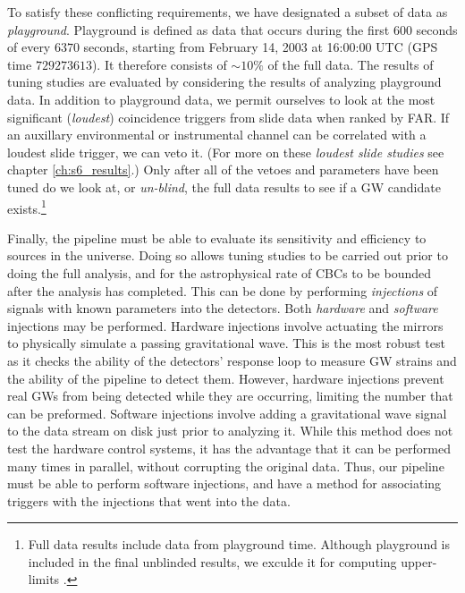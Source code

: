 To satisfy these conflicting requirements, we have designated a subset of data
as \emph{playground}. Playground is defined as data that occurs during the
first $600$ seconds of every $6370$ seconds, starting from February 14, 2003 at
16:00:00 UTC (GPS time $729273613$). It therefore consists of $\sim10\%$ of the
full data. The results of tuning studies are evaluated by considering the
results of analyzing playground data. In addition to playground data, we permit
ourselves to look at the most significant (\emph{loudest}) coincidence triggers
from slide data when ranked by \ac{FAR}. If an auxillary environmental or
instrumental channel can be correlated with a loudest slide trigger, we can
veto it. (For more on these \emph{loudest slide studies} see chapter
\ref{ch:s6_results}.) Only after all of the vetoes and parameters have been
tuned do we look at, or \emph{un-blind}, the full data results to see if a
\ac{GW} candidate exists.\footnote{Full data results include data from
playground time. Although playground is included in the final unblinded
results, we exculde it for computing upper-limits \cite{Collaboration:2009tt,
Abbott:2009qj, Collaboration:S6CBClowmass}.} 

Finally, the pipeline must be able to evaluate its sensitivity and efficiency
to sources in the universe. Doing so allows tuning studies to be carried out
prior to doing the full analysis, and for the astrophysical rate of \ac{CBC}s
to be bounded after the analysis has completed. This can be done by performing
\emph{injections} of signals with known parameters into the detectors. Both
\emph{hardware} and \emph{software} injections may be performed. Hardware
injections involve actuating the mirrors to physically simulate a passing
gravitational wave. This is the most robust test as it checks the ability of
the detectors' response loop to measure \ac{GW} strains and the ability of the
pipeline to detect them. However, hardware injections prevent real \ac{GW}s
from being detected while they are occurring, limiting the number that can be
preformed.  Software injections involve adding a gravitational wave signal to
the data stream on disk just prior to analyzing it. While this method does not
test the hardware control systems, it has the advantage that it can be
performed many times in parallel, without corrupting the original data. Thus,
our pipeline must be able to perform software injections, and have a method for
associating triggers with the injections that went into the data.


